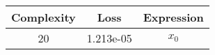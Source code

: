 \begin{center}
        \begin{tabular}{|c|c|c|}
        \hline
        Complexity & Loss & Expression \\
        \hline
        20 & 1.213e-05 & $\begin{aligned}x_{0}\end{aligned}$\\ \hline\end{tabular}
        \end{center}
        